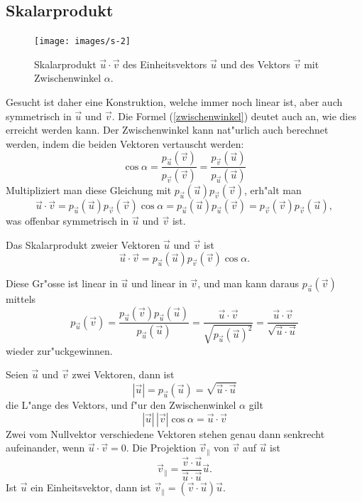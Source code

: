 \subsection{Skalarprodukt}
\begin{figure}
\begin{center}
\texttt{[image: images/s-2]}
\end{center}
\caption{Skalarprodukt $\vec u\cdot \vec v$ des Einheitsvektors $\vec u$
und des Vektors $\vec v$ mit Zwischenwinkel
$\alpha$.\label{image-skalarprodukt}}
\end{figure}
Gesucht ist daher eine Konstruktion, welche immer noch linear ist,
aber auch symmetrisch in $\vec u$ und $\vec v$.
Die Formel (\ref{zwischenwinkel}) deutet auch an, wie dies erreicht
werden kann.
Der Zwischenwinkel kann nat"urlich auch berechnet werden,
indem die beiden Vektoren vertauscht werden:
\[
\cos \alpha
=
\frac{p_{\vec u}(\vec v)}{p_{\vec v}(\vec v)}
=
\frac{p_{\vec v}(\vec u)}{p_{\vec u}(\vec u)}
\]
Multipliziert man diese Gleichung mit
$
p_{\vec u}(\vec u)
p_{\vec v}(\vec v)
$, erh"alt man
\[
\vec u\cdot\vec v
=
p_{\vec u}(\vec u)
p_{\vec v}(\vec v)
\cos\alpha =
p_{\vec u}(\vec u)p_{\vec u}(\vec v)
=
p_{\vec v}(\vec v)p_{\vec v}(\vec u),
\]
was offenbar symmetrisch in $\vec u$ und $\vec v$ ist.

\begin{definition}Das Skalarprodukt zweier Vektoren $\vec u$ und
$\vec v$ ist
\[
\vec u\cdot\vec v
=
p_{\vec u}(\vec u)
p_{\vec v}(\vec v)
\cos\alpha.
\]
\end{definition}
Diese Gr"osse ist linear in $\vec u$ und linear in $\vec v$, und man kann
daraus $p_{\vec u}(\vec v)$ mittels
\[
p_{\vec u}(\vec v)
=
\frac{p_{\vec u}(\vec v)p_{\vec u}(\vec u)}{p_{\vec u}(\vec u)}
=
\frac{\vec u\cdot\vec v}{\sqrt{p_{\vec u}(\vec u)^2}}
=
\frac{\vec u\cdot\vec v}{\sqrt{\vec u\cdot \vec u}}
\]
wieder zur"uckgewinnen.

\begin{satz}
Seien $\vec u$ und $\vec v$ zwei Vektoren, dann ist
\[
|\vec u|=p_{\vec u}(\vec u)=\sqrt{\vec u\cdot\vec u}
\]
die L"ange des Vektors, und f"ur den Zwischenwinkel $\alpha$ gilt
\[
|\vec u|\,|\vec v|\cos\alpha=\vec u\cdot\vec v
\]
Zwei vom Nullvektor verschiedene Vektoren  stehen genau dann senkrecht
aufeinander, wenn $\vec u\cdot\vec v=0$.
Die Projektion $\vec v_{\|}$ von $\vec v$ auf $\vec u$ ist
\[
\vec v_{\|}=\frac{\vec v\cdot\vec u}{\vec u\cdot\vec u}\vec u.
\]
Ist $\vec u$ ein Einheitsvektor, dann ist $\vec v_{\|}=(\vec v\cdot \vec u)\vec u$.
\end{satz}

